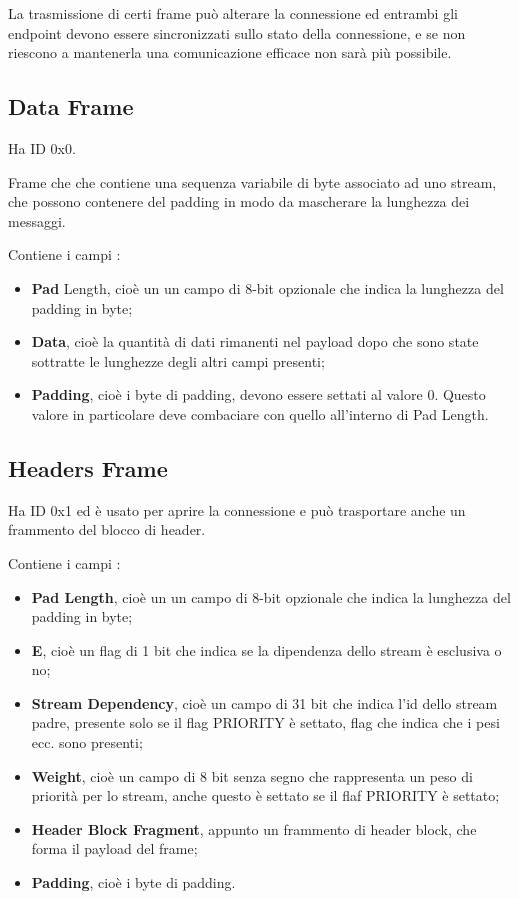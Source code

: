 \documentclass[12pt, a4paper]{article} %
\begin{document}
La trasmissione di certi frame può alterare la connessione ed entrambi gli endpoint devono essere sincronizzati sullo stato della connessione, e se non riescono a mantenerla una comunicazione efficace non sarà più possibile.

\subsection{Data Frame}
Ha ID 0x0. 

Frame che che contiene una sequenza variabile di byte associato ad uno stream, che possono contenere del padding in modo da mascherare la lunghezza dei messaggi.

Contiene i campi :
\begin{itemize}
  \item \textbf{Pad} Length, cioè un un campo di 8-bit opzionale che indica la lunghezza del padding in byte;
  \item \textbf{Data}, cioè la quantità di dati rimanenti nel payload dopo che sono state sottratte le lunghezze degli altri campi presenti;
  \item \textbf{Padding}, cioè i byte di padding, devono essere settati al valore 0. Questo valore in particolare deve combaciare con quello all'interno di Pad Length.
\end{itemize}

\subsection{Headers Frame}
Ha ID 0x1 ed è usato per aprire la connessione e può trasportare anche un frammento del blocco di header.

Contiene i campi :
\begin{itemize}
  \item \textbf{Pad Length}, cioè un un campo di 8-bit opzionale che indica la lunghezza del padding in byte;
  \item \textbf{E}, cioè un flag di 1 bit che indica se la dipendenza dello stream è esclusiva o no;
  \item \textbf{Stream Dependency}, cioè un campo di 31 bit che indica l'id dello stream padre, presente solo se il flag PRIORITY è settato, flag che indica che i pesi ecc. sono presenti;
  \item \textbf{Weight}, cioè un campo di 8 bit senza segno che rappresenta un peso di priorità per lo stream, anche questo è settato se il flaf PRIORITY è settato;
  \item \textbf{Header Block Fragment}, appunto un frammento di header block, che forma il payload del frame;
  \item \textbf{Padding}, cioè i byte di padding.
\end{itemize}
\end{document}
